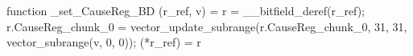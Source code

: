 function _set_CauseReg_BD (r_ref, v) = {
    r = __bitfield_deref(r_ref);
    r.CauseReg_chunk_0 = vector_update_subrange(r.CauseReg_chunk_0, 31, 31, vector_subrange(v, 0, 0));
    (*r_ref) = r
}

